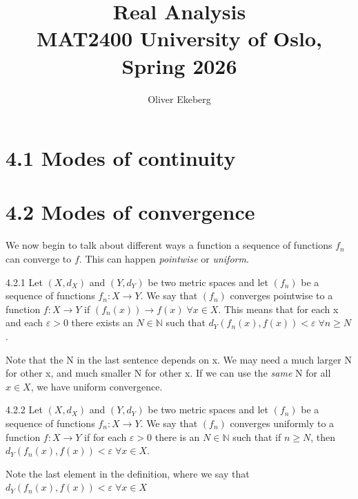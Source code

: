 \documentclass[a4paper,norsk]{article}
\title{Real Analysis \\ MAT2400 University of Oslo, Spring 2026}
\author{Oliver Ekeberg}
\renewcommand{\geq}{\geqslant}
\renewcommand{\epsilon}{\varepsilon}
\begin{document}
\maketitle
\tableofcontents


\section*{4.1 Modes of continuity}




\section*{4.2 Modes of convergence}


We now begin to talk about different ways a function a sequence of functions $ f_n $ can converge to $ f $. This can happen \textit{pointwise} or \textit{uniform}. 

\begin{definitionbox}{4.2.1}{}
Let $ \left( X, d_X \right)  $ and $ \left( Y, d_Y \right)  $ be two metric spaces and let $ \left( f_n \right)  $ be a sequence of functions $ f_n : X \to Y $. We say that $ \left( f_n \right)  $ converges pointwise to a function $ f: X \to Y $  if $ \left( f_n (x)\right) \to f(x) \; \forall x \in X  $. This means that for each x and each $ \epsilon >0 $ there exists an $ N \in \mathbb{N} $ such that $ d_Y \left( f_n(x), f(x) \right) < \epsilon  \; \forall n \geq N $.
\end{definitionbox}

Note that the N in the last sentence depends on x. We may need a much larger N for other x, and much smaller N for other x. If we can use the \textit{same} N for all $ x \in X $, we have uniform convergence. 

\begin{definitionbox}{4.2.2}{}
Let $ \left( X, d_X \right)  $ and $ \left( Y, d_Y \right)  $ be two metric spaces and let $ \left( f_n \right)  $ be a sequence of functions $ f_n : X \to Y $. We say that $ \left( f_n \right)  $ converges uniformly to a function $ f : X \to Y $ if for each $ \epsilon >0 $ there is an $ N \in \mathbb{N} $ such that if $ n \geq N $, then $ d_Y \left( f_n(x), f(x) \right) < \epsilon  \; \forall x \in X $.
\end{definitionbox}

Note the last element in the definition, where we say that $ d_Y \left( f_n(x), f(x) \right) < \epsilon \; \forall x \in X $ 
\end{document}
